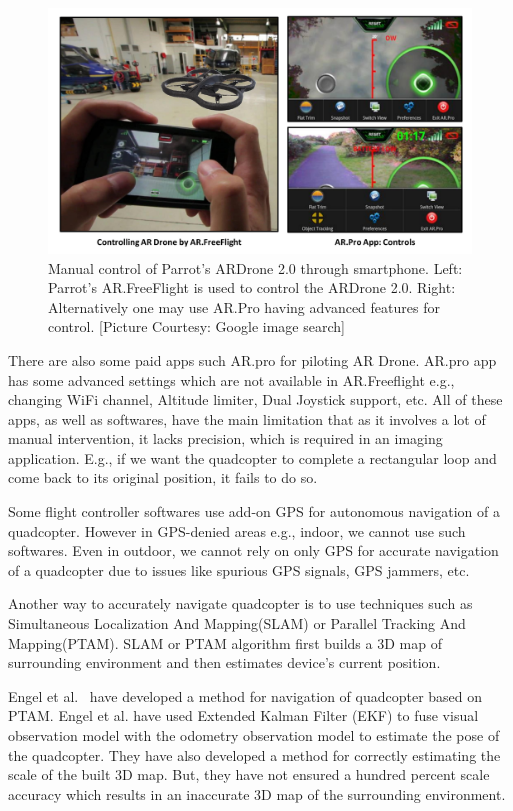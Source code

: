 \begin{figure}[h!]
  \includegraphics[width=\textwidth]{figures/manualControl}
   \caption[Manual control of Parrot's ARDrone 2.0]{Manual control of Parrot's
  ARDrone 2.0 through smartphone. Left: Parrot's AR.FreeFlight is used to
  control the ARDrone 2.0. 
  Right: Alternatively one may use AR.Pro having advanced features for control.
  [Picture Courtesy: Google image search]}
   \label{fig:manualControl}
\end{figure}

There are also some paid apps such AR.pro for piloting AR Drone. AR.pro app
has some advanced settings which are not available in AR.Freeflight e.g.,
changing WiFi channel, Altitude limiter, Dual Joystick support, etc. All of
these apps, as well as softwares, have the main limitation that as it involves a lot of manual
intervention, it lacks precision, which is required in an imaging application.
E.g., if we want the quadcopter to complete a rectangular loop and come back to its original
position, it fails to do so. 

Some flight controller softwares use add-on GPS for autonomous navigation of
a quadcopter. However in GPS-denied areas e.g., indoor, we cannot use such
softwares. Even in outdoor, we cannot rely on only GPS for accurate
navigation of a quadcopter due to issues like spurious GPS signals, GPS jammers,
etc.

Another way to accurately navigate quadcopter is to use techniques such as
Simultaneous Localization And Mapping(SLAM)\cite{Davison:2007} or Parallel Tracking And
Mapping(PTAM)\cite{klein}. SLAM or PTAM algorithm first builds a 3D map of
surrounding environment and then estimates device's current position.

Engel et al.~\cite{Engel12} have developed a method for navigation of quadcopter
based on PTAM\cite{klein}. Engel et al. have used Extended Kalman Filter (EKF)
to fuse visual observation model with the odometry observation model to estimate
the pose of the quadcopter. They have also developed a method for
correctly estimating the scale of the built 3D map. But, they have not ensured
a hundred percent scale accuracy which results in an inaccurate 3D map of
the surrounding environment.

